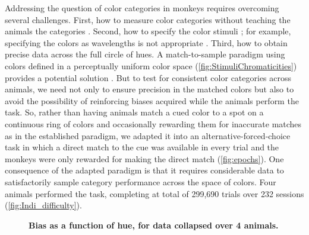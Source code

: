 Addressing the question of color categories in monkeys requires overcoming several challenges. 
First, how to measure color categories without teaching the animals the categories%
. 
Second, how to specify the color stimuli %
; for example, specifying the colors as wavelengths%
is not appropriate %
. 
Third, how to obtain precise data across the full circle of hues. 
A match-to-sample paradigm using colors defined in a perceptually uniform color space (\autoref{fig:StimuliChromaticities}) provides a potential solution
. 
But to test for consistent color categories across animals, we need not only to ensure precision in the matched colors but also to avoid the possibility of reinforcing biases acquired while the animals perform the task. 
So, rather than having animals match a cued color to a spot on a continuous ring of colors and occasionally rewarding them for inaccurate matches as in the established paradigm, we adapted it into an alternative-forced-choice task in which a direct match to the cue was available in every trial and the monkeys were only rewarded for making the direct match (\autoref{fig:epochs}). 
One consequence of the adapted paradigm is that it requires considerable data to satisfactorily sample category performance across the space of colors. 
Four animals performed the task, completing at total of 299,690 trials over 232 sessions (\autoref{fig:Indi_difficulty}).

\begin{figure}
    \centering
        \begin{subfigure}[t]{0.36\textwidth}
         \centering
         \caption{}
         
         \label{fig:CombinedDifficulty}
    \end{subfigure}
    \hfill
    \begin{subfigure}[t]{0.36\textwidth}
         \centering
         \caption{}
         
         \label{fig:CombinedLinear}
    \end{subfigure}
    \hfill
    \begin{subfigure}[t]{0.25\textwidth}
         \centering
         \caption{}
         
         \label{fig:CombinedPolar}
    \end{subfigure}
    \caption{\textbf{Bias as a function of hue, for data collapsed over 4 animals.} 
    }
    \label{fig:AvResults}
\end{figure}


